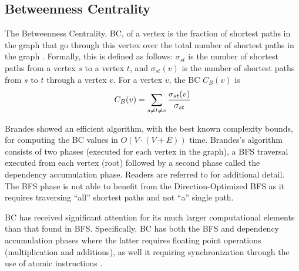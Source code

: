 


\subsection{Betweenness Centrality}
The Betweenness Centrality, BC, of a vertex is the fraction of shortest paths in the graph that go through this vertex over the total number of shortest paths in the graph \cite{Freeman1977}. Formally, this is defined as follows: $\sigma_{st}$ is the number of shortest paths from a vertex $s$ to a vertex $t$, and $\sigma_{st}(v)$ is the number of shortest paths from $s$ to $t$ through a vertex $v$. For a vertex $v$, the BC $C_B(v)$ is
\begin{equation}
C_B(v) = \sum_{s \neq t \neq v}\frac{\sigma_{st}(v)}{\sigma_{st}} \\
\end{equation}

Brandes \cite{Brandes2001} showed an efficient algorithm, with the best known complexity bounds, for computing the BC values in $O(V\cdot (V+E))$ time. Brandes's algorithm  consists of two phases (executed for each vertex in the graph),  a BFS traversal executed from each vertex (root) followed by a second phase called the dependency accumulation phase. Readers are referred to \cite{Brandes2001} for additional detail. The BFS phase is not able to benefit from the Direction-Optimized BFS \cite{beamer2012direction} as it requires traversing ``all'' shortest paths and not ``a'' single path.

BC has received significant attention for its much larger computational elements  than that found in BFS. Specifically, BC has both the BFS and dependency accumulation phases where the latter requires floating point operations (multiplication and additions), as well it requiring synchronization through the use of atomic instructions \cite{MadduriBaderParallel,green2013faster}. 
